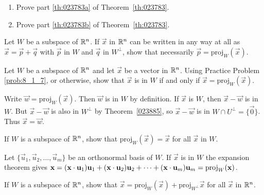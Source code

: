 \documentclass{ximera}
\begin{document}
\begin{problem}\label{prob:8_1_6}
\begin{enumerate}
\item Prove part \ref{th:023783a} of Theorem~\ref{th:023783}.

\item Prove part \ref{th:023783b} of Theorem~\ref{th:023783}.

\end{enumerate}
\end{problem}

\begin{problem} \label{prob:8_1_7}
Let $W$ be a subspace of $\mathbb{R}^n$. If $\vec{x}$ in $\mathbb{R}^n$ can be written in any way at all as $\vec{x} = \vec{p} + \vec{q}$ with $\vec{p}$ in $W$ and $\vec{q}$ in $W^\perp$, show that necessarily $\vec{p} = \mbox{proj}_W(\vec{x})$.
\end{problem}

\begin{problem}\label{prob:8_1_8}
Let $W$ be a subspace of $\mathbb{R}^n$ and let $\vec{x}$ be a vector in $\mathbb{R}^n$. Using Practice Problem \ref{prob:8_1_7}, or otherwise, show that $\vec{x}$ is in $W$ if and only if $\vec{x} = \mbox{proj}_W(\vec{x})$.

\begin{hint}
Write $\vec{w} = \mbox{proj}_W(\vec{x})$. Then $\vec{w}$ is in $W$ by definition. If $\vec{x}$ is $W$, then $\vec{x} - \vec{w}$ is in $W$. But $\vec{x} - \vec{w}$ is also in $W^\perp$ by Theorem~\ref{023885}, so $\vec{x} - \vec{w}$ is in $W \cap U^\perp = \{\vec{0}\}$. Thus $\vec{x} = \vec{w}$.
\end{hint}
\end{problem}


\begin{problem}\label{prob:8_1_10}
If $W$ is a subspace of $\mathbb{R}^n$, show that $\mbox{proj}_W(\vec{x}) = \vec{x}$ for all $\vec{x}$ in $W$.

\begin{hint}
Let $\{\vec{u}_{1}, \vec{u}_{2}, \dots , \vec{u}_{m}\}$ be an orthonormal basis of $W$. If $\vec{x}$ is in $W$ the expansion theorem gives $\mathbf{x} = (\mathbf{x} \cdot \mathbf{u}_{1})\mathbf{u}_{1} + (\mathbf{x} \cdot \mathbf{u}_{2})\mathbf{u}_{2} + \dots  + (\mathbf{x} \cdot \mathbf{u}_{m})\mathbf{u}_{m} = \mbox{proj}_W(\mathbf{x})$.
\end{hint}
\end{problem}

\begin{problem}\label{prob:8_1_11}
If $W$ is a subspace of $\mathbb{R}^n$, show that $\vec{x} = \mbox{proj}_W(\vec{x}) + \mbox{proj}_{W^\perp}\vec{x}$ for all $\vec{x}$ in $\mathbb{R}^n$.
\end{problem}
\end{document}
